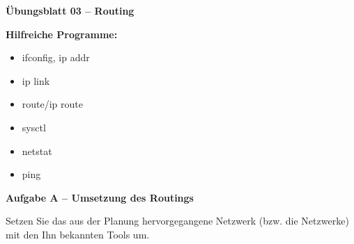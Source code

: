 \documentclass[paper=a4,fontsize=11pt]{scrartcl}%
\numberwithin{equation}{section}
\begin{document}
\begin{center}
\Large{\textbf{Übungsblatt 03 -- Routing}}
\end{center}
\textbf{Hilfreiche Programme:}
\begin{multicols}{3}
\begin{itemize}
	\item ifconfig, ip addr
	\item ip link
	\item route/ip route
	\item sysctl
	\item netstat 
	\item ping
\end{itemize}
\end{multicols}
	
\begin{center}\Large{\textbf{Aufgabe A -- Umsetzung des Routings}}\end{center}\vskip0.25in
Setzen Sie das aus der Planung hervorgegangene Netzwerk (bzw. die Netzwerke) mit den Ihn bekannten Tools um.
\end{document}
